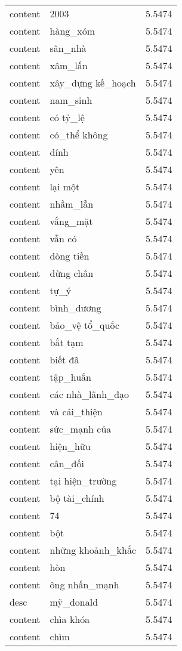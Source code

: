 \documentclass{article}
\begin{document}
\begin{tabular}{lll}
content & 2003 & 5.5474\\
content & hàng\_xóm & 5.5474\\
content & sân\_nhà & 5.5474\\
content & xâm\_lấn & 5.5474\\
content & xây\_dựng kế\_hoạch & 5.5474\\
content & nam\_sinh & 5.5474\\
content & có tỷ\_lệ & 5.5474\\
content & có\_thể không & 5.5474\\
content & dính & 5.5474\\
content & yên & 5.5474\\
content & lại một & 5.5474\\
content & nhầm\_lẫn & 5.5474\\
content & vắng\_mặt & 5.5474\\
content & vẫn có & 5.5474\\
content & dòng tiền & 5.5474\\
content & dừng chân & 5.5474\\
content & tự\_ý & 5.5474\\
content & bình\_dương & 5.5474\\
content & bảo\_vệ tổ\_quốc & 5.5474\\
content & bắt tạm & 5.5474\\
content & biết đã & 5.5474\\
content & tập\_huấn & 5.5474\\
content & các nhà\_lãnh\_đạo & 5.5474\\
content & và cải\_thiện & 5.5474\\
content & sức\_mạnh của & 5.5474\\
content & hiện\_hữu & 5.5474\\
content & cân\_đối & 5.5474\\
content & tại hiện\_trường & 5.5474\\
content & bộ tài\_chính & 5.5474\\
content & 74 & 5.5474\\
content & bột & 5.5474\\
content & những khoảnh\_khắc & 5.5474\\
content & hòn & 5.5474\\
content & ông nhấn\_mạnh & 5.5474\\
desc & mỹ\_donald & 5.5474\\
content & chìa khóa & 5.5474\\
content & chìm & 5.5474\\

\end{tabular}
\end{document}
